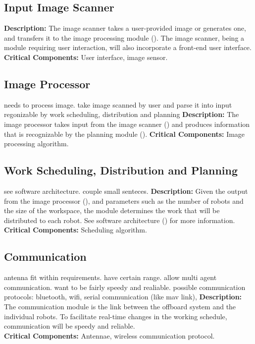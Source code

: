\subsection{Input Image Scanner}
\label{sec:subsystem_input_scanner}
\textbf{Description:} The image scanner takes a user-provided image or generates one, and transfers it to the image processing module (). The image scanner, being a module requiring user interaction, will also incorporate a front-end user interface.\\
\textbf{Critical Components:} User interface, image sensor.\\

\subsection{Image Processor}
\label{sec:subsystem_image_processor}
needs to process image. take image scanned by user and parse it into input regonizable by work scheduling, distribution and planning
\textbf{Description:} The image processor takes input from the image scanner () and produces information that is recognizable by the planning module (). 
\textbf{Critical Components:} Image processing algorithm.

\subsection{Work Scheduling, Distribution and Planning}
\label{sec:subsystem_planner}
see software architecture. couple small senteces.
\textbf{Description:} Given the output from the image processor (), and parameters such as the number of robots and the size of the workspace, the module determines the work that will be distributed to each robot. See software architecture () for more information.\\
\textbf{Critical Components:} Scheduling algorithm.\\

\subsection{Communication}
\label{sec:subsystem_communication}
antenna fit within requirements. have certain range. allow multi agent communication. want to be fairly speedy and realiable. possible communication protocols: bluetooth, wifi, serial communication (like mav link),
\textbf{Description:} The communication module is the link between the offboard system and the individual robots. To facilitate real-time changes in the working schedule, communication will be speedy and reliable. \\
\textbf{Critical Components:} Antennae, wireless communication protocol.\\


